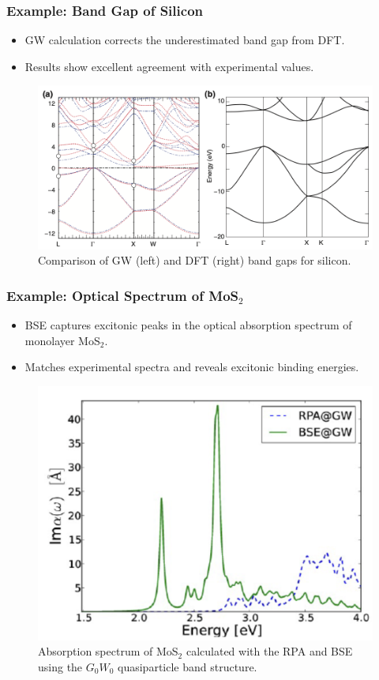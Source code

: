 \documentclass{CustomBeamer}
\begin{document}
        \begin{frame}
        \frametitle{Example: Band Gap of Silicon}
        \begin{itemize}
            \item GW calculation corrects the underestimated band gap from DFT.
            \item Results show excellent agreement with experimental values.
        \end{itemize}
        \begin{figure}
            \centering
            \includegraphics[width=0.7\linewidth]{gw_band_gap.png}
            \caption{Comparison of GW (left) and DFT (right) band gaps for silicon.}
        \end{figure}
        \end{frame}
        
        \begin{frame}
        \frametitle{Example: Optical Spectrum of MoS$_2$}
        \begin{itemize}
            \item BSE captures excitonic peaks in the optical absorption spectrum of monolayer MoS$_2$.
            \item Matches experimental spectra and reveals excitonic binding energies.
        \end{itemize}
        \begin{figure}
            \centering
            \includegraphics[width=0.4\linewidth]{bse_optical_spectrum.png}
            \caption{  Absorption spectrum of MoS$_2$ calculated with the RPA and BSE using the $G_0W_0$ quasiparticle band structure.}
        \end{figure}
        \end{frame}
        
\end{document}
